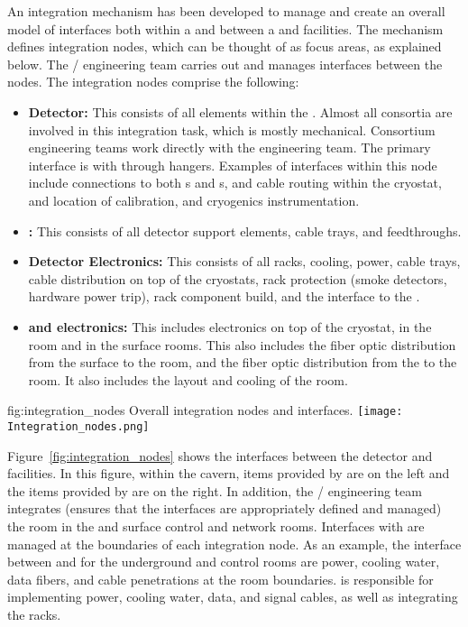 An integration mechanism has been developed to manage and create an
overall model of interfaces both within a  and
between a  and facilities. The mechanism defines
integration nodes, which can be thought of as focus areas, as
explained below.  The / engineering team carries out and
manages interfaces between the nodes. The integration nodes comprise the following:
\begin{itemize}
\item {\bf Detector:} This consists of all  elements within
  the . Almost all consortia are involved in this
  integration task, which is mostly mechanical. Consortium engineering
  teams work directly with the  engineering team.  The
  primary interface is with  through hangers. Examples of
  interfaces within this node include   connections to both
  s and s,  and  cable
  routing within the cryostat, and location of calibration, and
  cryogenics instrumentation.
\item {\bf {}:} This consists of all detector support elements,
  cable trays, and feedthroughs.
\item {\bf Detector Electronics:} This consists of all racks, cooling,
  power, cable trays, cable distribution on top of the cryostats, rack
  protection (smoke detectors, hardware power trip), rack component
  build, and the interface to the .
\item {\bf {} and electronics:} This includes electronics on
  top of the cryostat, in the  room and in the surface
  rooms. This also includes the fiber optic distribution from the
  surface to the  room, and the fiber optic distribution
  from the  to the  room. It also includes the
  layout and cooling of the  room.
\end{itemize}

\begin{dunefigure}{fig:integration_nodes}
  {Overall integration nodes and interfaces.}
  \texttt{[image: Integration\_nodes.png]}
\end{dunefigure}
Figure~\ref{fig:integration_nodes} shows the interfaces between the
detector and facilities. In this figure, within the cavern, items
provided by  are on the left and the items provided by
 are on the right. In addition, the / engineering
team integrates (ensures that the interfaces are appropriately defined
and managed) the  room in the  and surface
control and network rooms. Interfaces with 
are managed at the boundaries of each integration node. As an example,
the interface between  and  for the
underground  and control rooms are power, cooling water,
data fibers, and cable penetrations at the room
boundaries.  is responsible for implementing power,
cooling water, data, and signal cables, as well as integrating the
racks.


